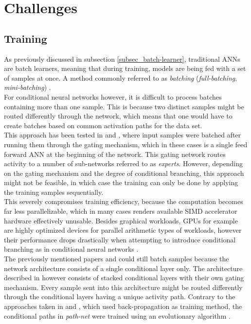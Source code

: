 \clearpage

\section{Challenges}

\subsection{Training}
 
As previously discussed in subsection \ref{subsec_batch-learner}, traditional \acp{ANN} are batch learners, 
meaning that during training, models are being fed with a set of samples at once. 
A method commonly referred to as \textit{batching} (\textit{full-batching}, \textit{mini-batching}) \cite[p. 32-33]{Patterson-Gibson-2017}. \\

For conditional neural networks however, it is difficult to process batches containing more than one sample. This is because two distinct samples might be routed differently through the network, which means that one would have to create batches based on common activation paths for the data set. \\
This approach has been tested in \cite[p. 5]{14_sparsely-gated-experts_2017} and \cite{24_MoE-eigen2014},
where input samples were batched after running them through the gating mechanism, which in these cases is a single feed forward \acs{ANN} at the beginning of the network. 
This gating network routes
activity to a number of sub-networks referred to as \textit{experts}. 
However, depending on the gating mechanism and the degree of conditional branching, this approach might not be feasible, in which case the training can only be done by applying the training samples sequentially. \\

This severely compromises training efficiency, because the computation becomes far less parallelizable, which in many cases renders available \acs{SIMD} accelerator hardware effectively unusable. 
Besides graphical workloads, GPUs for example are highly optimized devices for parallel arithmetic types of workloads, however their performance drops drastically when attempting to introduce conditional branching as in conditional neural networks \cite[p. 2]{14_sparsely-gated-experts_2017}. \\

The previously mentioned papers \cite{14_sparsely-gated-experts_2017} and \cite{24_MoE-eigen2014} could still batch samples because the
network architecture consists of a single conditional layer only.
The architecture described in  however
consists of stacked conditional layers with their own gating mechanism.
Every sample sent into this architecture might be routed differently
through the conditional layers having a unique activity path.
Contrary to the approaches taken in \cite{14_sparsely-gated-experts_2017} and \cite{24_MoE-eigen2014}, which used back-propagation as training method, 
the conditional paths in \textit{path-net} were trained using an evolutionary algorithm \cite[p. 1]{27_path-net-evolution}.

